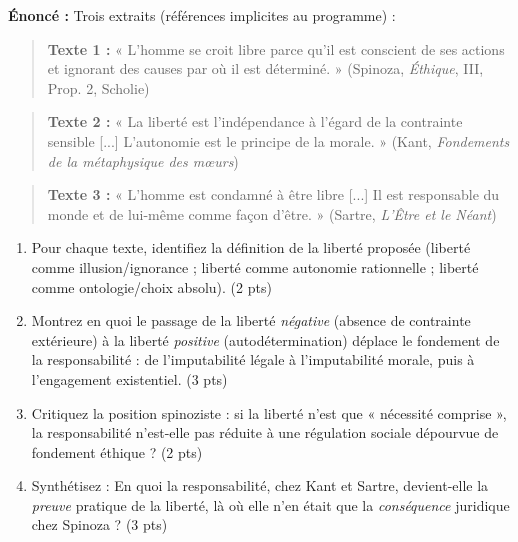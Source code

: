 \documentclass[11pt]{article}
\begin{document}
\begin{exercice}
\textbf{Énoncé :} Trois extraits (références implicites au programme) :
\begin{quote}
\textbf{Texte 1 :} « L'homme se croit libre parce qu'il est conscient de ses actions et ignorant des causes par où il est déterminé. » (Spinoza, \textit{Éthique}, III, Prop. 2, Scholie)
\end{quote}
\begin{quote}
\textbf{Texte 2 :} « La liberté est l'indépendance à l'égard de la contrainte sensible [...] L'autonomie est le principe de la morale. » (Kant, \textit{Fondements de la métaphysique des mœurs})
\end{quote}
\begin{quote}
\textbf{Texte 3 :} « L'homme est condamné à être libre [...] Il est responsable du monde et de lui-même comme façon d'être. » (Sartre, \textit{L'Être et le Néant})
\end{quote}
\begin{enumerate}
    \item Pour chaque texte, identifiez la définition de la liberté proposée (liberté comme illusion/ignorance ; liberté comme autonomie rationnelle ; liberté comme ontologie/choix absolu). (2 pts)
    \item Montrez en quoi le passage de la liberté \textit{négative} (absence de contrainte extérieure) à la liberté \textit{positive} (autodétermination) déplace le fondement de la responsabilité : de l'imputabilité légale à l'imputabilité morale, puis à l'engagement existentiel. (3 pts)
    \item Critiquez la position spinoziste : si la liberté n'est que « nécessité comprise », la responsabilité n'est-elle pas réduite à une régulation sociale dépourvue de fondement éthique ? (2 pts)
    \item Synthétisez : En quoi la responsabilité, chez Kant et Sartre, devient-elle la \textit{preuve} pratique de la liberté, là où elle n'en était que la \textit{conséquence} juridique chez Spinoza ? (3 pts)
\end{enumerate}
\end{exercice}
\end{document}
